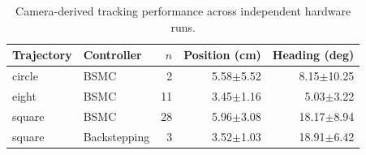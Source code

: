 \begin{table}[!t]
\centering
\caption{Camera-derived tracking performance across independent hardware runs.}
\label{tab:tracking}
\begin{tabular}{llrrr}
\hline
Trajectory & Controller & $n$ & Position (cm) & Heading (deg) \\
\hline
circle & BSMC & 2 & 5.58$\pm$5.52 & 8.15$\pm$10.25 \\
eight & BSMC & 11 & 3.45$\pm$1.16 & 5.03$\pm$3.22 \\
square & BSMC & 28 & 5.96$\pm$3.08 & 18.17$\pm$8.94 \\
square & Backstepping & 3 & 3.52$\pm$1.03 & 18.91$\pm$6.42 \\
\hline
\end{tabular}
\end{table}
